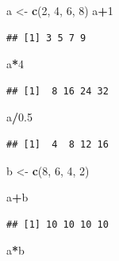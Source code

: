 \documentclass[
]{book}
\newenvironment{Shaded}{\begin{snugshade}}{\end{snugshade}}
\newcommand{\DecValTok}[1]{\textcolor[rgb]{0.00,0.00,0.81}{#1}}
\newcommand{\FloatTok}[1]{\textcolor[rgb]{0.00,0.00,0.81}{#1}}
\newcommand{\FunctionTok}[1]{\textcolor[rgb]{0.13,0.29,0.53}{\textbf{#1}}}
\newcommand{\NormalTok}[1]{#1}
\newcommand{\OtherTok}[1]{\textcolor[rgb]{0.56,0.35,0.01}{#1}}
\newcommand{\SpecialCharTok}[1]{\textcolor[rgb]{0.81,0.36,0.00}{\textbf{#1}}}
\begin{document}
\begin{Shaded}
\begin{Highlighting}[]
\NormalTok{a }\OtherTok{\textless{}{-}} \FunctionTok{c}\NormalTok{(}\DecValTok{2}\NormalTok{, }\DecValTok{4}\NormalTok{, }\DecValTok{6}\NormalTok{, }\DecValTok{8}\NormalTok{) }
\NormalTok{a}\SpecialCharTok{+}\DecValTok{1}
\end{Highlighting}
\end{Shaded}

\begin{verbatim}
## [1] 3 5 7 9
\end{verbatim}

\begin{Shaded}
\begin{Highlighting}[]
\NormalTok{a}\SpecialCharTok{*}\DecValTok{4}
\end{Highlighting}
\end{Shaded}

\begin{verbatim}
## [1]  8 16 24 32
\end{verbatim}

\begin{Shaded}
\begin{Highlighting}[]
\NormalTok{a}\SpecialCharTok{/}\FloatTok{0.5}
\end{Highlighting}
\end{Shaded}

\begin{verbatim}
## [1]  4  8 12 16
\end{verbatim}

\begin{Shaded}
\begin{Highlighting}[]
\NormalTok{b }\OtherTok{\textless{}{-}} \FunctionTok{c}\NormalTok{(}\DecValTok{8}\NormalTok{, }\DecValTok{6}\NormalTok{, }\DecValTok{4}\NormalTok{, }\DecValTok{2}\NormalTok{) }

\NormalTok{a}\SpecialCharTok{+}\NormalTok{b}
\end{Highlighting}
\end{Shaded}

\begin{verbatim}
## [1] 10 10 10 10
\end{verbatim}

\begin{Shaded}
\begin{Highlighting}[]
\NormalTok{a}\SpecialCharTok{*}\NormalTok{b}
\end{Highlighting}
\end{Shaded}
\end{document}
